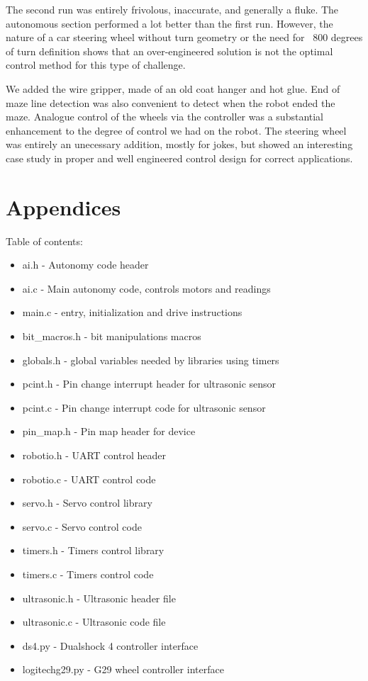 \documentclass[letterpaper,11pt]{texMemo} %
\begin{document}
The second run was entirely frivolous, inaccurate, and generally a fluke. The autonomous section performed 
a lot better than the first run. However, the nature of a car steering wheel without turn geometry 
or the need for ~800 degrees of turn definition shows that an over-engineered solution is not the 
optimal control method for this type of challenge.

We added the wire gripper, made of an old coat hanger and hot glue. End of maze line detection was also 
convenient to detect when the robot ended the maze. Analogue control of the wheels via the controller 
was a substantial enhancement to the degree of control we had on the robot. The steering wheel was entirely an 
unecessary addition, mostly for jokes, but showed an interesting case study in proper and well engineered control 
design for correct applications.

\newpage
\section*{Appendices}
Table of contents:
\begin{itemize}
    \item ai.h - Autonomy code header
    \item ai.c - Main autonomy code, controls motors and readings
    \item main.c - entry, initialization and drive instructions
    \item bit\_macros.h - bit manipulations macros
    \item globals.h - global variables needed by libraries using timers
    \item pcint.h - Pin change interrupt header for ultrasonic sensor
    \item pcint.c - Pin change interrupt code for ultrasonic sensor
    \item pin\_map.h - Pin map header for device
    \item robotio.h - UART control header
    \item robotio.c - UART control code
    \item servo.h - Servo control library
    \item servo.c - Servo control code
    \item timers.h - Timers control library
    \item timers.c - Timers control code
    \item ultrasonic.h - Ultrasonic header file
    \item ultrasonic.c - Ultrasonic code file
    \item ds4.py - Dualshock 4 controller interface
    \item logitechg29.py - G29 wheel controller interface
\end{itemize}
\newpage
\end{document}
